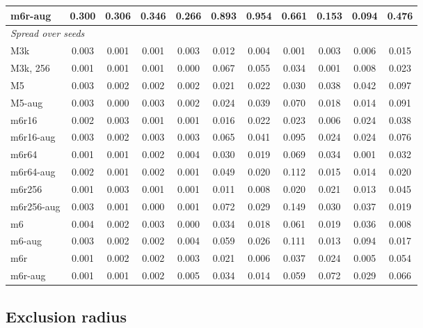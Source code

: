 \documentclass[preprint,12pt,authoryear]{elsarticle}
\begin{document}
\begin{table}[tbp]
{\begin{tabular}{lcccccccccc}
    m6r-aug & 0.300 & 0.306 & 0.346 & 0.266 & 0.893 & 0.954 & 0.661 & 0.153 & 0.094 & 0.476 \\
    \midrule
    \multicolumn{11}{l}{\textit{Spread over seeds}} \\
    M3k & 0.003 & 0.001 & 0.001 & 0.003 & 0.012 & 0.004 & 0.001 & 0.003 & 0.006 & 0.015 \\
    M3k, 256 & 0.001 & 0.001 & 0.001 & 0.000 & 0.067 & 0.055 & 0.034 & 0.001 & 0.008 & 0.023 \\
    M5 & 0.003 & 0.002 & 0.002 & 0.002 & 0.021 & 0.022 & 0.030 & 0.038 & 0.042 & 0.097 \\
    M5-aug & 0.003 & 0.000 & 0.003 & 0.002 & 0.024 & 0.039 & 0.070 & 0.018 & 0.014 & 0.091 \\
    m6r16 & 0.002 & 0.003 & 0.001 & 0.001 & 0.016 & 0.022 & 0.023 & 0.006 & 0.024 & 0.038 \\
    m6r16-aug & 0.003 & 0.002 & 0.003 & 0.003 & 0.065 & 0.041 & 0.095 & 0.024 & 0.024 & 0.076 \\
    m6r64 & 0.001 & 0.001 & 0.002 & 0.004 & 0.030 & 0.019 & 0.069 & 0.034 & 0.001 & 0.032 \\
    m6r64-aug & 0.002 & 0.001 & 0.002 & 0.001 & 0.049 & 0.020 & 0.112 & 0.015 & 0.014 & 0.020 \\
    m6r256 & 0.001 & 0.003 & 0.001 & 0.001 & 0.011 & 0.008 & 0.020 & 0.021 & 0.013 & 0.045 \\
    m6r256-aug & 0.003 & 0.001 & 0.000 & 0.001 & 0.072 & 0.029 & 0.149 & 0.030 & 0.037 & 0.019 \\
    m6 & 0.004 & 0.002 & 0.003 & 0.000 & 0.034 & 0.018 & 0.061 & 0.019 & 0.036 & 0.008 \\
    m6-aug & 0.003 & 0.002 & 0.002 & 0.004 & 0.059 & 0.026 & 0.111 & 0.013 & 0.094 & 0.017 \\
    m6r & 0.001 & 0.002 & 0.002 & 0.003 & 0.021 & 0.006 & 0.037 & 0.024 & 0.005 & 0.054 \\
    m6r-aug & 0.001 & 0.001 & 0.002 & 0.005 & 0.034 & 0.014 & 0.059 & 0.072 & 0.029 & 0.066 \\
    \bottomrule
  \end{tabular}}
\end{table}

\subsection{Exclusion radius}
\label{sec:res-radius}
\end{document}
